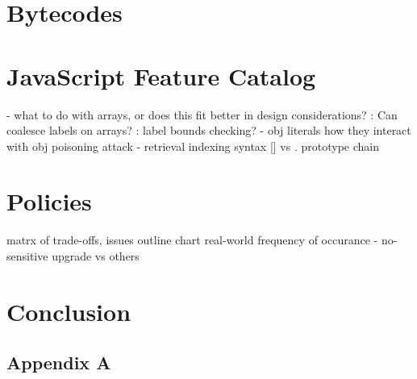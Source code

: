 \documentclass[12pt,fleqn]{ucithesis}
\begin{document}
\chapter{Bytecodes}
\chapter{JavaScript Feature Catalog}
 - what to do with arrays, or does this fit better in design considerations?
   : Can coalesce labels on arrays?
   : label bounds checking? 
 - obj literals
   how they interact with obj poisoning attack
 - retrieval
   indexing syntax [] vs .
   prototype chain
\chapter{Policies}
  matrx of trade-offs, issues
  outline chart
  real-world frequency of occurance
  - no-sensitive upgrade vs others
\chapter{Conclusion}

\clearpage
{}




\appendix
\section{Appendix A}
\end{document}
